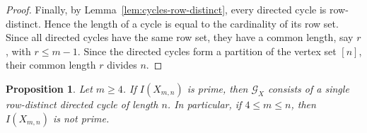 \documentclass[12pt]{amsart}
\numberwithin{equation}{section}
\newtheorem{Proposition}[Theorem]{Proposition}
\begin{document}
\begin{proof}
Finally, by Lemma~\ref{lem:cycles-row-distinct}, every directed cycle
is row-distinct. Hence the length of a cycle is equal to the
cardinality of its row set. Since all directed cycles have the same
row set, they have a common length, say $r$, with $r\leq m-1$.
Since the directed cycles form a partition of the vertex set $[n]$,
their common length $r$ divides $n$.
\end{proof}



\begin{Proposition}\label{prop:m-at-least-four-necessary}
Let $m\geq4$. If $I(X_{m,n})$ is prime, then
$\mathcal G_X$ consists of a single row-distinct directed cycle of
length $n$. In particular, if $4\leq m\leq n$, then
$I(X_{m,n})$ is not prime.
\end{Proposition}
\end{document}
